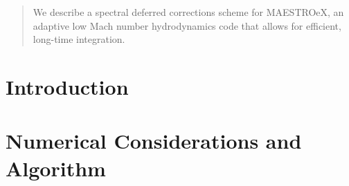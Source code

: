 \documentclass{aastex63}
\begin{document}

\begin{abstract}
  We describe a spectral deferred corrections scheme for MAESTROeX, an adaptive
  low Mach number hydrodynamics code that allows for efficient, long-time integration. 
\end{abstract}



\section{Introduction} \label{sec:intro}


\section{Numerical Considerations and Algorithm} \label{sec:equations}
\end{document}

